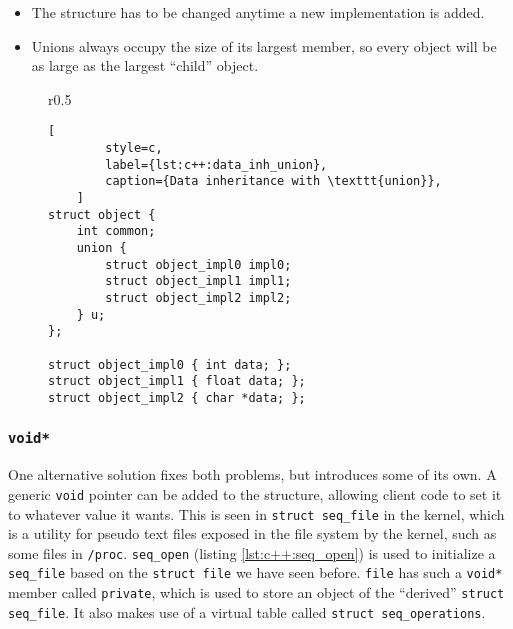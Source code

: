 \begin{itemize}
    \item The structure has to be changed anytime a new implementation is added.
    \item
        Unions always occupy the size of its largest member, so every object
        will be as large as the largest ``child'' object.
\end{itemize}

\begin{figure}[ht]
    \begin{wrapfigure}{r}{0.5\textwidth}
        \centering
        \renewcommand{\arraystretch}{1.25}
        \renewcommand{\arraystretch}{1}
    \end{wrapfigure}
    \begin{lstlisting}[
        style=c,
        label={lst:c++:data_inh_union},
        caption={Data inheritance with \texttt{union}},
    ]
struct object {
    int common;
    union {
        struct object_impl0 impl0;
        struct object_impl1 impl1;
        struct object_impl2 impl2;
    } u;
};

struct object_impl0 { int data; };
struct object_impl1 { float data; };
struct object_impl2 { char *data; };
    \end{lstlisting}
\end{figure}

\subsubsection{\texttt{void*}}

One alternative solution fixes both problems, but introduces some of its own.  A
generic \texttt{void} pointer can be added to the structure, allowing client
code to set it to whatever value it wants.  This is seen in \texttt{struct
seq\_file} in the kernel, which is a utility for pseudo text files exposed in
the file system by the kernel, such as some files in \texttt{/proc}.
\texttt{seq\_open} (listing \ref{lst:c++:seq_open}) is used to initialize a
\texttt{seq\_file} based on the \texttt{struct file} we have seen before.
\texttt{file} has such a \texttt{void*} member called \texttt{private}, which is
used to store an object of the ``derived'' \texttt{struct seq\_file}.  It also
makes use of a virtual table called \texttt{struct seq\_operations}.

